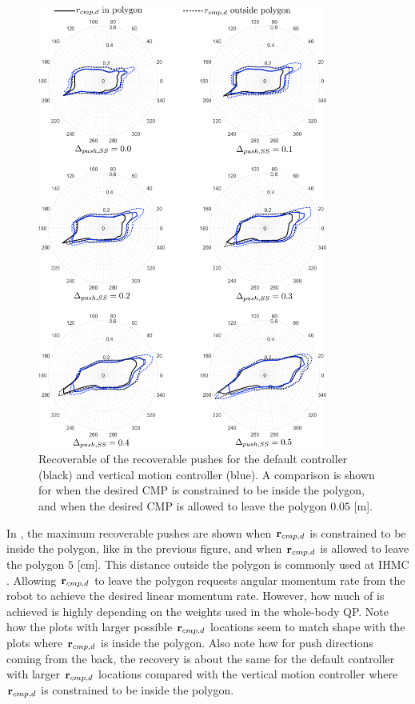 \begin{figure}
     \centering
        \includegraphics[width=0.85\textwidth]{STYLESTUFF/roundAng.png}
        \caption{Recoverable of the recoverable pushes for the default controller (black) and vertical motion controller (blue). A comparison is shown for when the desired \ac{CMP} is constrained to be inside the polygon, and when the desired \ac{CMP} is allowed to leave the polygon $0.05$ [m].}
        \label{fig:roundPushAng}
\end{figure}

In , the maximum recoverable pushes are shown when $\mathbf{r}_{cmp,d}$ is constrained to be inside the polygon, like in the previous figure, and when $\mathbf{r}_{cmp,d}$ is allowed to leave the polygon $5$ [cm]. This distance outside the polygon is commonly used at \ac{IHMC} \cite{griffin2017natural}. Allowing $\mathbf{r}_{cmp,d}$ to leave the polygon requests angular momentum rate from the robot to achieve the desired linear momentum rate. However, how much of is achieved is highly depending on the weights used in the whole-body \ac{QP}. Note how the plots with larger possible $\mathbf{r}_{cmp,d}$ locations seem to match shape with the plots where $\mathbf{r}_{cmp,d}$ is inside the polygon. Also note how for push directions coming from the back, the recovery is about the same for the default controller with larger $\mathbf{r}_{cmp,d}$ locations compared with the vertical motion controller where $\mathbf{r}_{cmp,d}$ is constrained to be inside the polygon.

